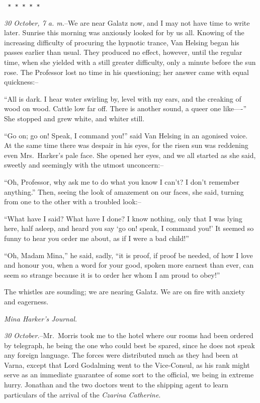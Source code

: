 \documentclass[12pt,openright]{book}
\begin{document}
\texttt{   *       *       *       *       *}

\textit{30 October, 7 a. m.}–We are near Galatz now, and I may not have time to write later. Sunrise this morning was anxiously looked for by us all. Knowing of the increasing difficulty of procuring the hypnotic trance, Van Helsing began his passes earlier than usual. They produced no effect, however, until the regular time, when she yielded with a still greater difficulty, only a minute before the sun rose. The Professor lost no time in his questioning; her answer came with equal quickness:–

“All is dark. I hear water swirling by, level with my ears, and the creaking of wood on wood. Cattle low far off. There is another sound, a queer one like—-” She stopped and grew white, and whiter still.

“Go on; go on! Speak, I command you!” said Van Helsing in an agonised voice. At the same time there was despair in his eyes, for the risen sun was reddening even Mrs. Harker’s pale face. She opened her eyes, and we all started as she said, sweetly and seemingly with the utmost unconcern:–

“Oh, Professor, why ask me to do what you know I can’t? I don’t remember anything.” Then, seeing the look of amazement on our faces, she said, turning from one to the other with a troubled look:–

“What have I said? What have I done? I know nothing, only that I was lying here, half asleep, and heard you say ‘go on! speak, I command you!’ It seemed so funny to hear you order me about, as if I were a bad child!”

“Oh, Madam Mina,” he said, sadly, “it is proof, if proof be needed, of how I love and honour you, when a word for your good, spoken more earnest than ever, can seem so strange because it is to order her whom I am proud to obey!”

The whistles are sounding; we are nearing Galatz. We are on fire with anxiety and eagerness.

\textit{Mina Harker’s Journal.}

\textit{30 October.}–Mr. Morris took me to the hotel where our rooms had been ordered by telegraph, he being the one who could best be spared, since he does not speak any foreign language. The forces were distributed much as they had been at Varna, except that Lord Godalming went to the Vice-Consul, as his rank might serve as an immediate guarantee of some sort to the official, we being in extreme hurry. Jonathan and the two doctors went to the shipping agent to learn particulars of the arrival of the \textit{Czarina Catherine}.
\end{document}
